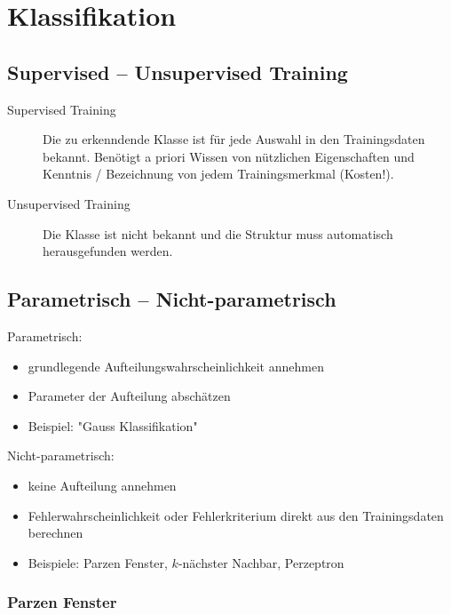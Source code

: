 
\section{Klassifikation}

\subsection{Supervised -- Unsupervised Training}

\begin{description}
\item[Supervised Training] Die zu erkenndende Klasse ist für jede Auswahl in den Trainingsdaten bekannt. Benötigt a priori Wissen von nützlichen Eigenschaften und Kenntnis / Bezeichnung von jedem Trainingsmerkmal (Kosten!).
\item[Unsupervised Training] Die Klasse ist nicht bekannt und die Struktur muss automatisch herausgefunden werden.
\end{description}

\subsection{Parametrisch -- Nicht-parametrisch}

Parametrisch:
\begin{itemize}
\item grundlegende Aufteilungswahrscheinlichkeit annehmen
\item Parameter der Aufteilung abschätzen
\item Beispiel: "{}Gauss Klassifikation"{}
\end{itemize}
Nicht-parametrisch:
\begin{itemize}
\item keine Aufteilung annehmen
\item Fehlerwahrscheinlichkeit oder Fehlerkriterium direkt aus den Trainingsdaten berechnen
\item Beispiele: Parzen Fenster, $k$-nächster Nachbar, Perzeptron
\end{itemize}

\subsubsection*{Parzen Fenster}

